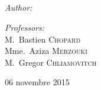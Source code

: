 \begin{titlepage}
\begin{center}
\textsc{\Large \reportsubject}\\[1cm]
\HRule \\[1cm]
{\huge \bfseries \reporttitle}\\[0.5cm]
\HRule \\[2cm]

\begin{minipage}[t]{0.6\textwidth}
  \begin{flushleft} \large
    \emph{Author:}\\
    \reportauthor
  \end{flushleft}
\end{minipage}
\begin{minipage}[t]{0.39\textwidth}
  \begin{flushright} \large
    \emph{Professors:} \\
    M.~Bastien \textsc{ Chopard } \\ %
    Mme.~Aziza \textsc{Merzouki }\\
    M.~Gregor \textsc{Chliamovitch} %
  \end{flushright}
\end{minipage}

\vfill

{\large 06 novembre 2015}

\end{center}

\end{titlepage}
